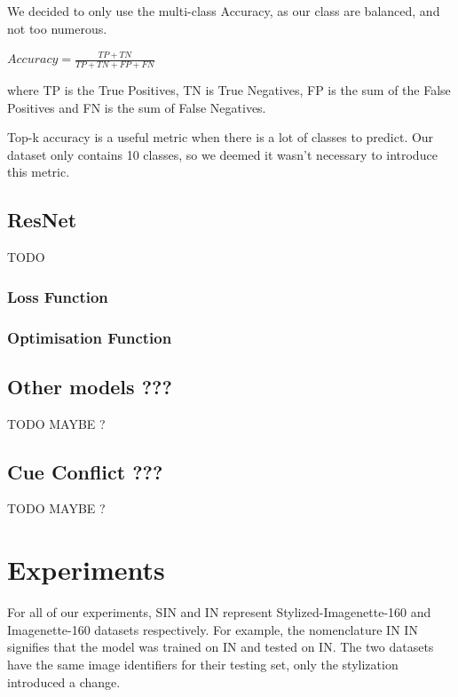 \documentclass{article}
\begin{document}
We decided to only use the multi-class Accuracy, as our class are balanced, and not too numerous. \medskip \par

$ Accuracy = \frac{TP + TN}{TP + TN + FP + FN}  $ \medskip \par

\noindent
where TP is the True Positives, TN is True Negatives, FP is the sum of the False Positives
and FN is the sum of False Negatives. \medskip \par

\noindent
Top-k accuracy is a useful metric when there is a lot of classes to predict. Our dataset only
contains 10 classes, so we deemed it wasn't necessary to introduce this metric.

\subsection{ResNet}

TODO

\subsubsection{Loss Function}

\subsubsection{Optimisation Function}


\subsection{Other models ???}

TODO MAYBE ?

\subsection{Cue Conflict ???}

TODO MAYBE ?

\newpage
\section{Experiments}

For all of our experiments, SIN and IN represent Stylized-Imagenette-160 and Imagenette-160 datasets respectively.
For example, the nomenclature IN \texorpdfstring{\textrightarrow} .IN signifies that the 
model was trained on IN and tested on IN.
The two datasets have the same image identifiers for their testing set, only the stylization introduced a change.
\end{document}
